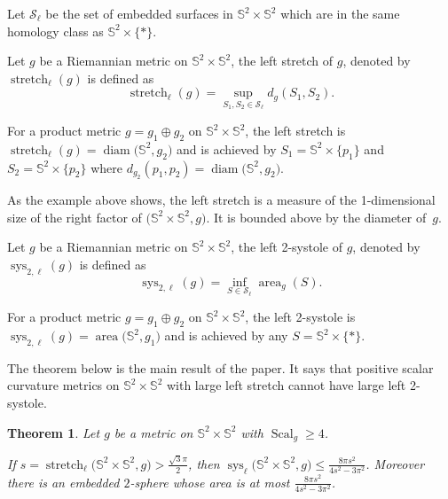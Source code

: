 \documentclass[10pt,a4paper]{amsart}
\numberwithin{equation}{section}
\newtheorem{thm}{Theorem}[section]
\DeclareMathOperator{\scal}{Scal}
\DeclareMathOperator{\diam}{diam}
\DeclareMathOperator{\aire}{area}
\DeclareMathOperator{\sys}{sys}
\DeclareMathOperator{\str}{stretch}
\begin{document}
Let $\mathcal{S}_\ell$ be the set of embedded surfaces in
$\mathbb{S}^2\times\mathbb{S}^2$ which are in the same homology class
as $\mathbb{S}^2\times\{\ast\}$.

\begin{dfn}
 Let $g$ be a Riemannian metric on
 $\mathbb{S}^2\times\mathbb{S}^2$, the left stretch of $g$, denoted
 by $\str_{\ell}(g)$ is defined as
 \[\str_{\ell}(g)=\sup_{S_1,S_2\in\mathcal{S}_\ell}d_g\left(S_1,S_2\right).\]
\end{dfn}
\begin{ex}
 For a product metric $g=g_1\oplus g_2$ on
 $\mathbb{S}^2\times\mathbb{S}^2$, the left stretch is
 $\str_{\ell}(g)=\diam\big(\mathbb{S}^2,g_2\big)$ and is achieved by
 $S_1=\mathbb{S}^2\times\{p_1\}$ and $S_2=\mathbb{S}^2\times\{p_2\}$
 where $d_{g_2}(p_1,p_2)=\diam\big(\mathbb{S}^2,g_2\big)$.
\end{ex}
As the example above shows, the left stretch is a measure of the
1-dimensional size of the right factor of $\big(\mathbb{S}^2\times
\mathbb{S}^2,g\big)$. It is bounded above by the diameter of~$g$.
\begin{dfn}\label{dfn-str}
 Let $g$ be a Riemannian metric on
 $\mathbb{S}^2\times\mathbb{S}^2$, the left 2-systole of $g$, denoted
 by $\sys_{2,\ell}(g)$ is defined as
 \[\sys_{2,\ell}(g)=\inf_{S\in\mathcal{S}_\ell}\aire_g(S).\]
\end{dfn}
\begin{ex}
 For a product metric $g=g_1\oplus g_2$ on
 $\mathbb{S}^2\times\mathbb{S}^2$, the left 2-systole is
 $\sys_{2,\ell}(g)=\aire\big(\mathbb{S}^2,g_1\big)$ and is achieved by
 any $S=\mathbb{S}^2\times\{\ast\}$.
\end{ex}

The theorem below is the main result of the paper. It says that
positive scalar curvature metrics on $\mathbb{S}^2\times\mathbb{S}^2$
with large left stretch cannot have large left 2-systole.

\begin{thm}\label{thm-main}
 Let $g$ be a metric on $\mathbb{S}^2\times\mathbb{S}^2$ with
 $\scal_g\geq 4$.

 If $s=\str_{\ell}\big(\mathbb{S}^2\times \mathbb{S}^2,g\big) >
 \tfrac{\sqrt{3}\pi}{2}$, then $\sys_{\ell}\big(\mathbb{S}^2\times
 \mathbb{S}^2,g\big)\leq \frac{8\pi s^2}{4s^2-3\pi^2}$. Moreover there is
 an embedded $2$-sphere whose area is at most $\frac{8\pi s^2}{4s^2-3\pi^2}$.
\end{thm}
\end{document}
